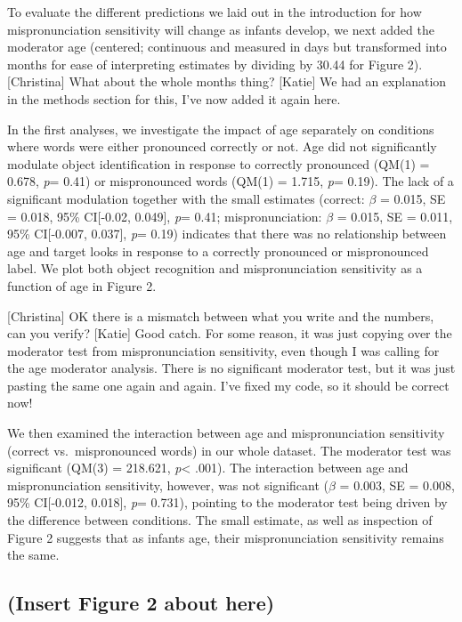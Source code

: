 \documentclass[man]{apa6}
\theoremstyle{definition}
\theoremstyle{definition}
\theoremstyle{definition}
\theoremstyle{remark}
\begin{document}
To evaluate the different predictions we laid out in the introduction
for how mispronunciation sensitivity will change as infants develop, we
next added the moderator age (centered; continuous and measured in days
but transformed into months for ease of interpreting estimates by
dividing by 30.44 for Figure 2). {[}Christina{]} What about the whole
months thing? {[}Katie{]} We had an explanation in the methods section
for this, I've now added it again here.

In the first analyses, we investigate the impact of age separately on
conditions where words were either pronounced correctly or not. Age did
not significantly modulate object identification in response to
correctly pronounced (QM(1) = 0.678, \emph{p}= 0.41) or mispronounced
words (QM(1) = 1.715, \emph{p}= 0.19). The lack of a significant
modulation together with the small estimates (correct: \(\beta\) =
0.015, SE = 0.018, 95\% CI{[}-0.02, 0.049{]}, \emph{p}= 0.41;
mispronunciation: \(\beta\) = 0.015, SE = 0.011, 95\% CI{[}-0.007,
0.037{]}, \emph{p}= 0.19) indicates that there was no relationship
between age and target looks in response to a correctly pronounced or
mispronounced label. We plot both object recognition and
mispronunciation sensitivity as a function of age in Figure 2.

{[}Christina{]} OK there is a mismatch between what you write and the
numbers, can you verify? {[}Katie{]} Good catch. For some reason, it was
just copying over the moderator test from mispronunciation sensitivity,
even though I was calling for the age moderator analysis. There is no
significant moderator test, but it was just pasting the same one again
and again. I've fixed my code, so it should be correct now!

We then examined the interaction between age and mispronunciation
sensitivity (correct vs.~mispronounced words) in our whole dataset. The
moderator test was significant (QM(3) = 218.621, \emph{p}\textless{}
.001). The interaction between age and mispronunciation sensitivity,
however, was not significant (\(\beta\) = 0.003, SE = 0.008, 95\%
CI{[}-0.012, 0.018{]}, \emph{p}= 0.731), pointing to the moderator test
being driven by the difference between conditions. The small estimate,
as well as inspection of Figure 2 suggests that as infants age, their
mispronunciation sensitivity remains the same.

\subsection{(Insert Figure 2 about
here)}\label{insert-figure-2-about-here}
\end{document}
